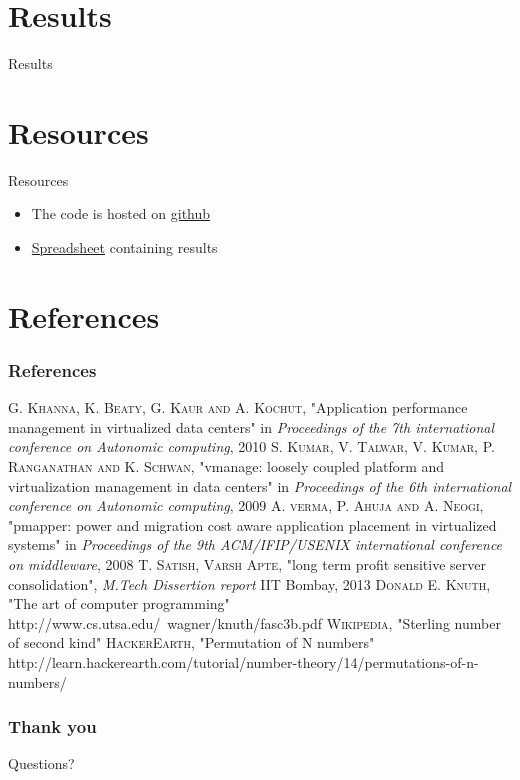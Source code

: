 \documentclass{beamer}
\makeatletter
\newcounter{multipleslide}
\newcommand{\multipleframe}
{
	\setcounter{multipleslide}{\value{framenumber}}
	\stepcounter{multipleslide}
	\patchcmd{\beamer@@tmpl@footline}
	{\insertframenumber}
	{\themultipleslide}
	{}
	{}
}
\newcommand{\restoreframe}
{
	\patchcmd{\beamer@@tmpl@footline}
	{\themultipleslide}
  	{\insertframenumber}
	{}
	{}
	\setcounter{framenumber}{\value{multipleslide}}
}
\makeatother
\begin{document}
\section{Results}
\begin{frame}{Results}
\addtocounter{framenumber}{-1}
\tableofcontents[currentsection]
\end{frame}

\section{Resources}
\begin{frame}{Resources}
\begin{itemize}
\item The code is hosted on  \href{https://github.com/mangalaman93/simcon}{github}
\item \href{https://docs.google.com/spreadsheet/ccc?key=0Aoq3-tdSgQ83dGEzakJoUk9pYjlmSXVNN3p1bGtwLWc}{Spreadsheet} containing results
\end{itemize}
\end{frame}


\section{References}
\multipleframe
\begin{frame}[allowframebreaks]
\frametitle{References}
\begin{thebibliography}{9}
    \textsc{G. Khanna, K. Beaty, G. Kaur and A. Kochut}, "Application performance management in virtualized data centers" in \textit{Proceedings of the 7th international conference on Autonomic computing}, 2010
    \textsc{S. Kumar, V. Talwar, V. Kumar, P. Ranganathan and K. Schwan}, "vmanage: loosely coupled platform and virtualization management in data centers" in \textit{Proceedings of the 6th international conference on Autonomic computing}, 2009
    \textsc{A. verma, P. Ahuja and A. Neogi}, "pmapper: power and migration cost aware application placement in virtualized systems" in \textit{Proceedings of the 9th ACM/IFIP/USENIX international conference on middleware}, 2008
    \textsc{T. Satish, Varsh Apte}, "long term profit sensitive server consolidation", \textit{M.Tech Dissertion report} IIT Bombay, 2013
    \textsc{Donald E. Knuth}, "The art of computer programming" http://www.cs.utsa.edu/~wagner/knuth/fasc3b.pdf
    \textsc{Wikipedia}, "Sterling number of second kind"
    \textsc{HackerEarth}, "Permutation of N numbers" http://learn.hackerearth.com/tutorial/number-theory/14/permutations-of-n-numbers/
\end{thebibliography}
\end{frame}
\restoreframe

\begin{frame} \frametitle{Thank you}
\Huge{\centerline{\color{theme_color}Questions?}}
\end{frame}
\end{document}
